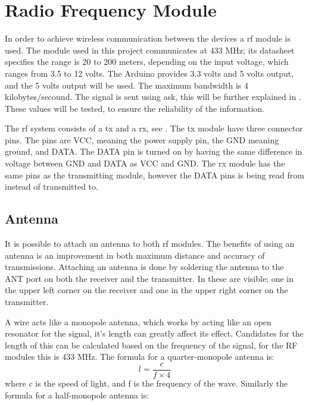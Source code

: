 \section{Radio Frequency Module} \label{rfmodule}
In order to achieve wireless communication between the devices a \gls{rf} module is used.
The module used in this project communicates at 433 MHz; its datasheet specifies the range is 20 to 200 meters, depending on the input voltage, which ranges from 3.5 to 12 volts. 
The Arduino provides 3.3 volts and 5 volts output, and the 5 volts output will be used.
The maximum bandwidth is 4 kilobytes/secound. 
The signal is sent using \gls{ask}, this will be further explained in .
These values will be tested, to ensure the reliability of the information. 

The \gls{rf} system consists of a \gls{tx} and a \gls{rx}, see .
The \gls{tx} module have three connector pins.
The pins are VCC, meaning the power supply pin, the GND meaning ground, and DATA.
The DATA pin is turned on by having the same difference in voltage between GND and DATA as VCC and GND. 
The \gls{rx} module has the same pins as the transmitting module, however the DATA pins is being read from instead of transmitted to.


\subsection{Antenna}
It is possible to attach an antenna to both \gls{rf} modules. 
The benefits of using an antenna is an improvement in both maximum distance and accuracy of transmissions.
Attaching an antenna is done by soldering the antenna to the ANT port on both the receiver and the transmitter. 
In  these are visible; one in the upper left corner on the receiver and one in the upper right corner on the transmitter. 

A wire acts like a monopole antenna, which works by acting like an open resonator for the signal, it's length can greatly affect its effect. 
Candidates for the length of this can be calculated based on the frequency of the signal, for the RF modules this is 433 MHz.
The formula for a quarter-monopole antenna is: 
\begin{equation} \label{QMA}
l = \frac{c}{f \times 4}
\end{equation}
where c is the speed of light, and f is the frequency of the wave.
Similarly the formula for a half-monopole antenna is: 

